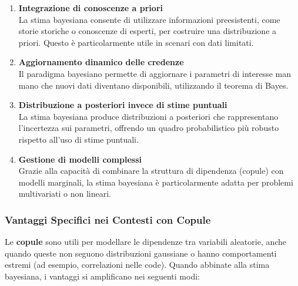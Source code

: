 \documentclass[%
	corpo=11pt,
    twoside,
    stile=classica,
    oldstyle,
    tipotesi=custom,
    greek,
    evenboxes,
]{toptesi}
\begin{document}
\begin{enumerate}
	\item \textbf{Integrazione di conoscenze a priori} \\
	La stima bayesiana consente di utilizzare informazioni preesistenti, come storie storiche o conoscenze di esperti, per costruire una distribuzione a priori. Questo è particolarmente utile in scenari con dati limitati.
	
	\item \textbf{Aggiornamento dinamico delle credenze} \\
	Il paradigma bayesiano permette di aggiornare i parametri di interesse man mano che nuovi dati diventano disponibili, utilizzando il teorema di Bayes.
	
	\item \textbf{Distribuzione a posteriori invece di stime puntuali} \\
	La stima bayesiana produce distribuzioni a posteriori che rappresentano l’incertezza sui parametri, offrendo un quadro probabilistico più robusto rispetto all’uso di stime puntuali.
	
	\item \textbf{Gestione di modelli complessi} \\
	Grazie alla capacità di combinare la struttura di dipendenza (copule) con modelli marginali, la stima bayesiana è particolarmente adatta per problemi multivariati o non lineari.
\end{enumerate}

\subsubsection{Vantaggi Specifici nei Contesti con Copule}

Le \textbf{copule} sono utili per modellare le dipendenze tra variabili aleatorie, anche quando queste non seguono distribuzioni gaussiane o hanno comportamenti estremi (ad esempio, correlazioni nelle code). Quando abbinate alla stima bayesiana, i vantaggi si amplificano nei seguenti modi:
\end{document}
